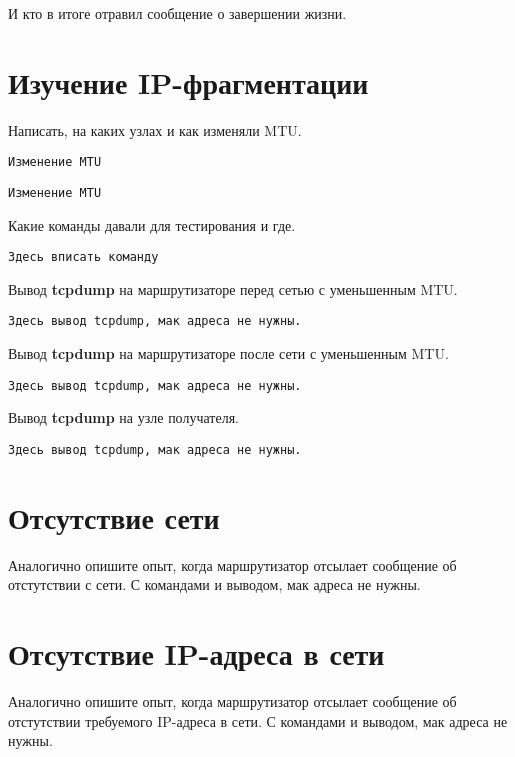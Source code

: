 \documentclass[a4paper,12pt]{article}
\begin{document}
И кто в итоге отравил сообщение о завершении жизни.

\section{Изучение IP-фрагментации}

Написать, на каких узлах и как изменяли MTU.


\begin{Verbatim}
Изменение MTU
\end{Verbatim}

\begin{Verbatim}
Изменение MTU
\end{Verbatim}


Какие команды давали для тестирования и где.

\begin{Verbatim}
Здесь вписать команду
\end{Verbatim}

Вывод \textbf{tcpdump} на маршрутизаторе перед сетью с уменьшенным MTU.


\begin{Verbatim}
Здесь вывод tcpdump, мак адреса не нужны.
\end{Verbatim}

Вывод \textbf{tcpdump} на маршрутизаторе после сети с уменьшенным MTU.


\begin{Verbatim}
Здесь вывод tcpdump, мак адреса не нужны.
\end{Verbatim}


Вывод \textbf{tcpdump} на узле получателя.

\begin{Verbatim}
Здесь вывод tcpdump, мак адреса не нужны.
\end{Verbatim}


\section{Отсутствие сети}

Аналогично опишите опыт, когда маршрутизатор отсылает сообщение об отстутствии с сети.
С командами и выводом, мак адреса не нужны.


\section{Отсутствие IP-адреса в сети}

Аналогично опишите опыт, когда маршрутизатор отсылает сообщение об отстутствии требуемого IP-адреса в сети.
С командами и выводом, мак адреса не нужны.
\end{document}
